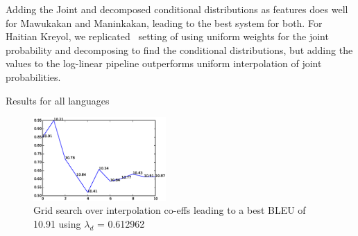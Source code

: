 Adding the Joint and decomposed conditional distributions as features does well for Mawukakan and Maninkakan, leading to the best system for both. For Haitian Kreyol, we replicated~\cite{Cohn:07} setting of using uniform weights for the joint probability and decomposing to find the conditional distributions, but adding the values to the log-linear pipeline outperforms uniform interpolation of joint probabilities.


\begin{table}
	\small
	\centering
	
	\caption{Results for all languages}
	\label{table:all_results}
\end{table}



     \begin{figure}[ht]
     			\small
                \centering
                \includegraphics[width=0.45\textwidth]{files/Figures/condor_run.eps}
                \caption{Grid search over interpolation co-effs leading to a best BLEU of 10.91 using $\lambda_{d}$ = 0.612962}
                \label{fig:condor}
     \end{figure}
